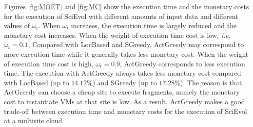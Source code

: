 Figures \ref{fig:MOET} and \ref{fig:MC} show the execution time and the monetary costs for the execution of SciEvol with different amounts of input data and different values of $\omega_t$. When $\omega_t$ increases, the execution time is largely reduced and the monetary cost increases. When the weight of execution time cost is low, \textit{i.e.} $\omega_t = 0.1$, Compared with LocBased and SGreedy, ActGreedy may correspond to more execution time while it generally takes less monetary cost. When the weight of execution time cost is high, \textit{$\omega_t = 0.9$}, ActGreedy corresponds to less execution time. The execution with ActGreedy always takes less monetary cost compared with LocBased (up to $14.12\%$) and SGreedy (up to $17.28\%$). The reason is that ActGreedy can choose a cheap site to execute fragments, namely the monetary cost to instantiate VMs at that site is low. As a result, ActGreedy makes a good trade-off between execution time and monetary costs for the execution of SciEvol at a multisite cloud.

